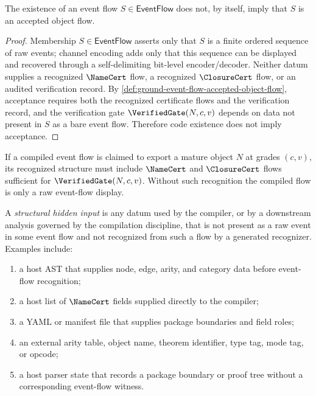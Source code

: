\begin{proposition}
\label{prop:ground-event-flow-code-not-accept}
The existence of an event flow $S \in \mathsf{EventFlow}$ does not, by itself, imply that $S$ is an accepted object flow.
\end{proposition}

\begin{proof}
Membership $S \in \mathsf{EventFlow}$ asserts only that $S$ is a finite ordered sequence of raw events; channel encoding adds only that this sequence can be displayed and recovered through a self-delimiting bit-level encoder/decoder. Neither datum supplies a recognized $\NameCert$ flow, a recognized $\ClosureCert$ flow, or an audited verification record. By \autoref{def:ground-event-flow-accepted-object-flow}, acceptance requires both the recognized certificate flows and the verification record, and the verification gate $\VerifiedGate(N, c, v)$ depends on data not present in $S$ as a bare event flow. Therefore code existence does not imply acceptance.
\end{proof}

\begin{corollary}
\label{cor:ground-event-flow-export-requires-cert}
If a compiled event flow is claimed to export a mature object $N$ at grades $(c, v)$, its recognized structure must include $\NameCert$ and $\ClosureCert$ flows sufficient for $\VerifiedGate(N, c, v)$. Without such recognition the compiled flow is only a raw event-flow display.
\end{corollary}

\begin{definition}
\label{def:ground-event-flow-structural-hidden-input}
A \emph{structural hidden input} is any datum used by the compiler, or by a downstream analysis governed by the compilation discipline, that is not present as a raw event in some event flow and not recognized from such a flow by a generated recognizer. Examples include:
\begin{enumerate}
  \item a host AST that supplies node, edge, arity, and category data before event-flow recognition;
  \item a host list of $\NameCert$ fields supplied directly to the compiler;
  \item a YAML or manifest file that supplies package boundaries and field roles;
  \item an external arity table, object name, theorem identifier, type tag, mode tag, or opcode;
  \item a host parser state that records a package boundary or proof tree without a corresponding event-flow witness.
\end{enumerate}
\end{definition}


